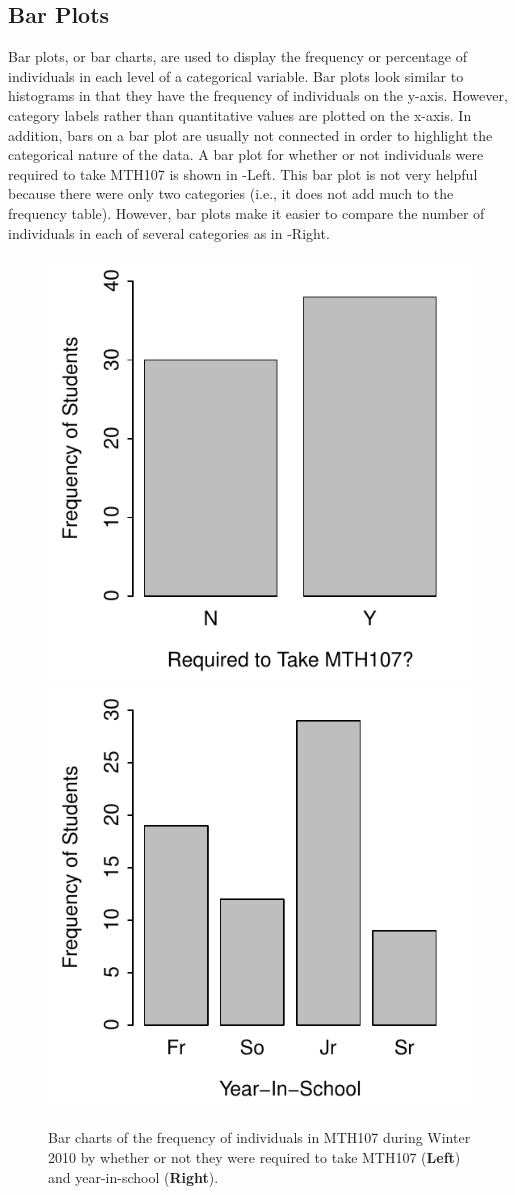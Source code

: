 \documentclass[10pt,openany]{book}\usepackage[]{graphicx}\usepackage[]{color}
\newenvironment{knitrout}{}{} %
\begin{document}
\subsection{Bar Plots}
Bar plots, or bar charts, are used to display the frequency or percentage of individuals in each level of a categorical variable.  Bar plots look similar to histograms in that they have the frequency of individuals on the y-axis.  However, category labels rather than quantitative values are plotted on the x-axis.  In addition, bars on a bar plot are usually not connected in order to highlight the categorical nature of the data.  A bar plot for whether or not individuals were required to take MTH107 is shown in -Left.  This bar plot is not very helpful because there were only two categories (i.e., it does not add much to the frequency table).  However, bar plots make it easier to compare the number of individuals in each of several categories as in -Right.

\begin{knitrout}
\color{fgcolor}\begin{figure}[hbtp]

{\centering \includegraphics[width=.4\linewidth]{Figs/MTH107BarChart-1} 
\includegraphics[width=.4\linewidth]{Figs/MTH107BarChart-2} 

}

\caption[Bar charts of the frequency of individuals in MTH107 during Winter 2010 by whether or not they were required to take MTH107 (\textbf{Left}) and year-in-school (\textbf{Right})]{Bar charts of the frequency of individuals in MTH107 during Winter 2010 by whether or not they were required to take MTH107 (\textbf{Left}) and year-in-school (\textbf{Right}).}\label{fig:MTH107BarChart}
\end{figure}


\end{knitrout}
\end{document}

